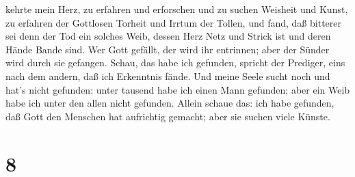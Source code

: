 kehrte mein Herz, zu erfahren und erforschen und zu suchen Weisheit und
Kunst, zu erfahren der Gottlosen Torheit und Irrtum der Tollen,
 und fand, daß bitterer sei denn der Tod ein solches Weib,
dessen Herz Netz und Strick ist und deren Hände Bande sind. Wer Gott
gefällt, der wird ihr entrinnen; aber der Sünder wird durch sie
gefangen.  Schau, das habe ich gefunden, spricht der
Prediger, eins nach dem andern, daß ich Erkenntnis fände. 
Und meine Seele sucht noch und hat's nicht gefunden: unter tausend habe
ich einen Mann gefunden; aber ein Weib habe ich unter den allen nicht
gefunden.  Allein schaue das: ich habe gefunden, daß Gott
den Menschen hat aufrichtig gemacht; aber sie suchen viele Künste.

\hypertarget{section-7}{%
\section{8}\label{section-7}}


